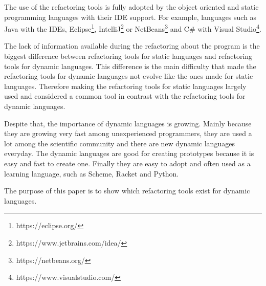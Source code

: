 The use of the refactoring tools is fully adopted by the object oriented and static programming languages with their IDE support.
For example, languages such as Java with the IDEs, Eclipse\footnote{https://eclipse.org/}, IntelliJ\footnote{https://www.jetbrains.com/idea/} or NetBeans\footnote{https://netbeans.org/} and C\# with Visual Studio\footnote{https://www.visualstudio.com/}.

The lack of information available during the refactoring about the program is the biggest difference between refactoring tools for static languages and refactoring tools for dynamic languages.
This difference is the main difficulty that made the refactoring tools for dynamic languages not evolve like the ones made for static languages. 
Therefore making the refactoring tools for static languages largely used and considered a common tool in contrast with the refactoring tools for dynamic languages.  %

Despite that, the importance of dynamic languages is growing.
Mainly because they are growing very fast among unexperienced programmers, they are used a lot among the scientific community and there are new dynamic languages everyday. 
The dynamic languages are good for creating prototypes because it is easy and fast to create one. 
Finally they are easy to adopt and often used as a learning language, such as Scheme, Racket and Python. %


The purpose of this paper is to show which refactoring tools exist for dynamic languages. %







